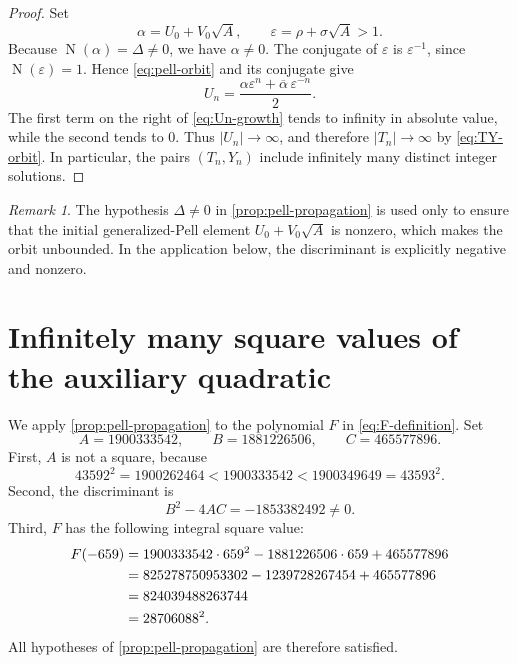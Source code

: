 \documentclass[11pt]{article}
\theoremstyle{remark}
\newtheorem{remark}[remark]{Remark}
\newcommand{\Norm}{\operatorname{N}}
\begin{document}
\begin{proof}
Set
\[
 \alpha=U_0+V_0\sqrt A,
 \qquad
 \varepsilon=\rho+\sigma\sqrt A>1.
\]
Because $\Norm(\alpha)=\Delta\ne0$, we have $\alpha\ne0$.  The conjugate of $\varepsilon$ is $\varepsilon^{-1}$, since $\Norm(\varepsilon)=1$.  Hence \eqref{eq:pell-orbit} and its conjugate give
\begin{equation}\label{eq:Un-growth}
 U_n=\frac{\alpha\varepsilon^n+\overline\alpha\,\varepsilon^{-n}}{2}.
\end{equation}
The first term on the right of \eqref{eq:Un-growth} tends to infinity in absolute value, while the second tends to $0$.  Thus $|U_n|\to\infty$, and therefore $|T_n|\to\infty$ by \eqref{eq:TY-orbit}.  In particular, the pairs $(T_n,Y_n)$ include infinitely many distinct integer solutions.
\end{proof}

\begin{remark}\label{rem:why-discriminant}
The hypothesis $\Delta\ne0$ in \cref{prop:pell-propagation} is used only to ensure that the initial generalized-Pell element $U_0+V_0\sqrt A$ is nonzero, which makes the orbit unbounded.  In the application below, the discriminant is explicitly negative and nonzero.
\end{remark}

\section{Infinitely many square values of the auxiliary quadratic}

We apply \cref{prop:pell-propagation} to the polynomial $F$ in \eqref{eq:F-definition}.  Set
\begin{equation}\label{eq:ABC-values}
 A=1900333542,
 \qquad
 B=1881226506,
 \qquad
 C=465577896.
\end{equation}
First, $A$ is not a square, because
\begin{equation}\label{eq:A-nonsquare}
 43592^2=1900262464
 <1900333542
 <1900349649=43593^2.
\end{equation}
Second, the discriminant is
\begin{equation}\label{eq:F-discriminant}
 B^2-4AC=-1853382492\ne0.
\end{equation}
Third, $F$ has the following integral square value:
\begin{align}
 F(-659)
 &=1900333542\cdot659^2-1881226506\cdot659+465577896 \notag\\
 &=825278750953302-1239728267454+465577896 \notag\\
 &=824039488263744 \notag\\
 &=28706088^2. \label{eq:initial-F-square}
\end{align}
All hypotheses of \cref{prop:pell-propagation} are therefore satisfied.
\end{document}
